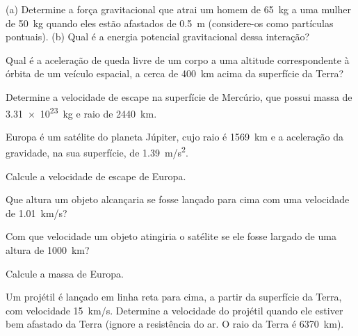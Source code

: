 \documentclass[a4paper]{article}
\begin{document}
\maketitle
 
\begin{exercicio}
  (a) Determine a força gravitacional que atrai um homem de \SI{65}{kg} a uma mulher de \SI{50}{kg} quando eles estão afastados de \SI{0.5}{m} (considere-os como partículas pontuais). (b) Qual é a energia potencial gravitacional dessa interação? 
\end{exercicio}

\begin{exercicio*}
  Qual é a aceleração de queda livre de um corpo a uma altitude correspondente à órbita de um veículo espacial, a cerca de \SI{400}{km} acima da superfície da Terra?
\end{exercicio*}

\begin{exercicio}
 Determine a velocidade de escape na superfície de Mercúrio, que possui massa de \SI{3.31e23}{kg} e raio de \SI{2440}{km}.
\end{exercicio}

\begin{exercicio}
 Europa é um satélite do planeta Júpiter, cujo raio é \SI{1569}{km} e a aceleração da gravidade, na sua superfície, de \SI{1.39}{m/s^2}.
\begin{compactenum}[(a)]
\item Calcule a velocidade de escape de Europa.
\item Que altura um objeto alcançaria se fosse lançado para cima com uma velocidade de \SI{1.01}{km/s}?
\item Com que velocidade um objeto atingiria o satélite se ele fosse largado de uma altura de \SI{1000}{km}?
\item Calcule a massa de Europa.
\end{compactenum}
\end{exercicio}

\begin{exercicio}
 Um projétil é lançado em linha reta para cima, a partir da superfície da Terra, com velocidade \SI{15}{km/s}.
Determine a velocidade do projétil quando ele estiver bem afastado da Terra (ignore a resistência do ar. O raio da Terra é \SI{6370}{km}).
\end{exercicio}
\end{document}
